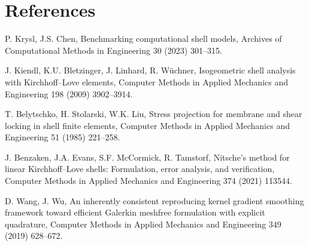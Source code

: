 \documentclass{article}
\begin{document}
\section*{References}
\begin{enumerate}[{[1]}]
    \item P. Krysl, J.S. Chen, Benchmarking computational shell models, Archives of Computational Methods in Engineering 30 (2023) 301–315. 
    \item J. Kiendl, K.U. Bletzinger, J. Linhard, R. Wüchner, Isogeometric shell analysis with Kirchhoff–Love elements, Computer Methods in Applied Mechanics and Engineering 198 (2009) 3902–3914. 
    \item T. Belytschko, H. Stolarski, W.K. Liu, Stress projection for membrane and shear locking in shell finite elements, Computer Methods in Applied Mechanics and Engineering 51 (1985) 221–258. 
    \item J. Benzaken, J.A. Evans, S.F. McCormick, R. Tamstorf, Nitsche’s method for linear Kirchhoff–Love shells: Formulation, error analysis, and verification, Computer Methods in Applied Mechanics and Engineering 374 (2021) 113544. 
    \item D. Wang, J. Wu, An inherently consistent reproducing kernel gradient smoothing framework toward efficient Galerkin meshfree formulation with explicit quadrature, Computer Methods in Applied Mechanics and Engineering 349 (2019) 628–672. 
\end{enumerate}
\end{document}
